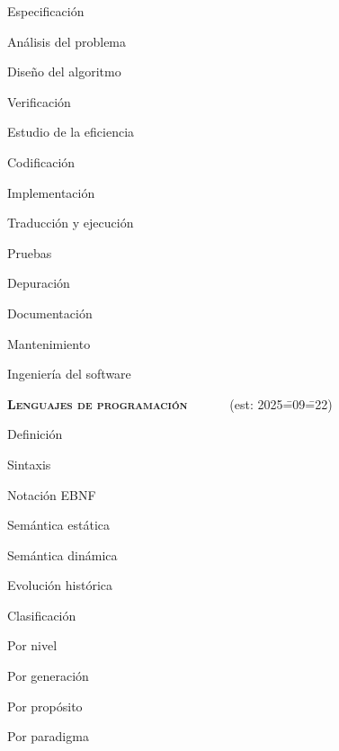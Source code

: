 \begin{longenum}
\begin{longenum}
        \begin{longenum}
            \item Especificación
            \item Análisis del problema
            \item Diseño del algoritmo
            \item Verificación
            \item Estudio de la eficiencia
            \item Codificación
            \begin{longenum}
                \item Implementación
            \end{longenum}
            \item Traducción y ejecución
            \item Pruebas
            \item Depuración
            \item Documentación
            \item Mantenimiento
            \item Ingeniería del software
        \end{longenum}
    \end{longenum}
    \item \textbf{\textsc{Lenguajes de programación}} \ \ \ \ \ \ (est: 2025\==09\==22)
    \begin{longenum}
        \item Definición
        \begin{longenum}
            \item Sintaxis
            \begin{longenum}
                \item Notación EBNF
            \end{longenum}
            \item Semántica estática
            \item Semántica dinámica
        \end{longenum}
        \item Evolución histórica \opcional\
        \item Clasificación
        \begin{longenum}
            \item Por nivel
            \item Por generación
            \item Por propósito
            \item Por paradigma

\end{longenum}
\end{longenum}
\end{longenum}
